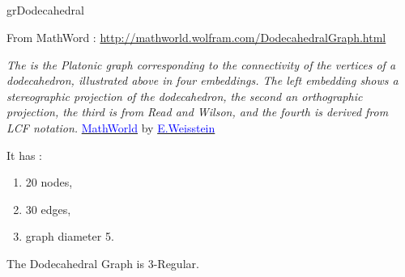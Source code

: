 \clearpage\newpage    
\subsection{}

\vspace*{2cm}
\begin{center}
\begin{tkzexample}[vbox]
\end{tkzexample} 
\end{center}

\clearpage\newpage    
\subsection{}

\vspace*{2cm}
\begin{center}
\begin{tkzexample}[vbox]
\end{tkzexample} 
\end{center}

\clearpage\newpage 

\begin{NewMacroBox}{grDodecahedral}{}

\medskip
From MathWord : \url{http://mathworld.wolfram.com/DodecahedralGraph.html} 

\emph{The   is the Platonic graph corresponding to the connectivity of the vertices of a dodecahedron, illustrated above in four embeddings. The left embedding shows a stereographic projection of the dodecahedron, the second an orthographic projection, the third is from Read and Wilson, and the fourth is derived from LCF notation.}
\href{http://mathworld.wolfram.com/DodecahedralGraph.html}%
           {\textcolor{blue}{MathWorld}} by \href{http://en.wikipedia.org/wiki/Eric_W._Weisstein}%
           {\textcolor{blue}{E.Weisstein}}

\medskip
It has :

\begin{enumerate}
 \item  20 nodes,
 \item  30 edges,
 \item  graph diameter 5.
\end{enumerate}

\medskip
 The  Dodecahedral Graph is 3-Regular.
\end{NewMacroBox}


